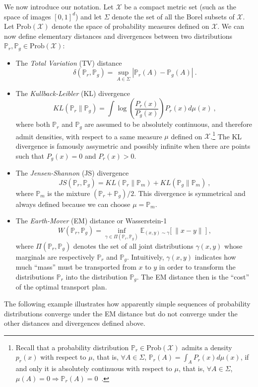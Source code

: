 \documentclass{article} %
\newcommand\EE{\mathbb{E}}
\newcommand\PP{\mathbb{P}}
\theoremstyle{definition}
\theoremstyle{definition}
\newcommand\manX{\mathcal{X}}
\begin{document}
We now introduce our notation. Let $\manX$ be a compact metric set
(such as the space of images $[0,1]^d$) and let $\Sigma$ denote the
set of all the Borel subsets of $\manX$. Let $\text{Prob}(\manX)$
denote the space of probability measures defined on $\manX$.
We can now define elementary distances and divergences
between two distributions $\PP_r,\PP_g\in\text{Prob}(\manX)$:
\begin{itemize}
\item
  The \emph{Total Variation} (TV) distance
  \[ \delta(\PP_r,\PP_g) = \sup_{A\in\Sigma} |\PP_r(A)-\PP_g(A)|~. \]
\item
  The \emph{Kullback-Leibler} (KL) divergence
  \[ KL(\PP_r\|\PP_g) = \int \log\left(\frac{P_r(x)}{P_g(x)}\right) P_r(x) d\mu(x)~, \]
  where both $\PP_r$ and $\PP_g$ are assumed to be absolutely continuous,
  and therefore admit densities, with respect to a same measure $\mu$ defined on $\manX$.\footnote{%
    Recall that a probability distribution
    $\PP_r\in\text{Prob}(\manX)$ admits a density $p_r(x)$ with
    respect to $\mu$, that is, $\forall A\in\Sigma$, $\PP_r(A) =
    \int_A P_r(x) d\mu(x)$, if and only it is absolutely continuous
    with respect to $\mu$, that is, $\forall A\in\Sigma$,
    $\mu(A)=0\Rightarrow\PP_r(A)=0$~.}
  The KL divergence is famously assymetric and possibly infinite when there
  are points such that $P_g(x)=0$ and $P_r(x)>0$.
\item
  The \emph{Jensen-Shannon} (JS) divergence
  \[ JS(\PP_r,\PP_g) = KL(\PP_r\|\PP_m)+KL(\PP_g\|\PP_m)~, \]
  where $\PP_m$ is the mixture $(\PP_r+\PP_g)/2$. This divergence
  is symmetrical and always defined because we can choose $\mu=\PP_m$.
\item
  The \emph{Earth-Mover} (EM) distance or Wasserstein-1
  \begin{equation}
    W(\PP_r, \PP_g) = \inf_{\gamma \in \Pi(\PP_r ,\PP_g)} \EE_{(x, y) \sim \gamma}\big[\:\|x - y\|\:\big]~,
    \label{eq::W}
  \end{equation}
  where $\Pi(\PP_r,\PP_g)$ denotes the set of all joint distributions
  $\gamma(x,y)$ whose marginals are respectively $\PP_r$ and
  $\PP_g$. Intuitively, $\gamma(x,y)$ indicates how much ``mass'' must
  be transported from $x$ to $y$ in order to transform the distributions
  $\PP_r$ into the distribution $\PP_g$. The EM distance then
  is the ``cost'' of the optimal transport plan.
\end{itemize}

The following example illustrates how apparently simple sequences of
probability distributions converge under the EM distance but do not
converge under the other distances and divergences defined above.
\end{document}
